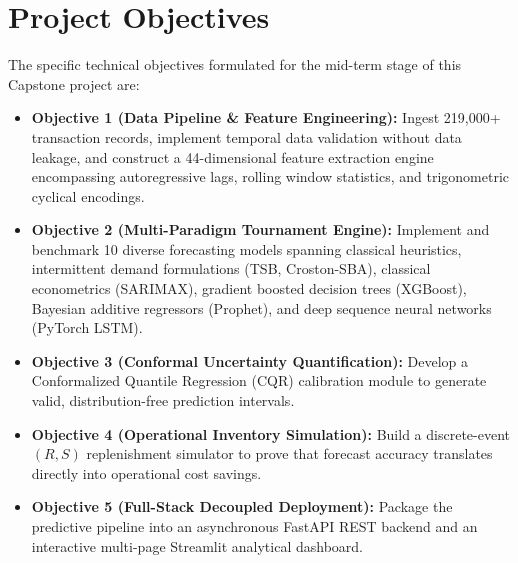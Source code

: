 \documentclass[12pt,a4paper,oneside]{report}
\theoremstyle{definition}
\begin{document}
\section{Project Objectives}
The specific technical objectives formulated for the mid-term stage of this Capstone project are:
\begin{itemize}[itemsep=0.2cm]
    \item \textbf{Objective 1 (Data Pipeline \& Feature Engineering):} Ingest 219,000+ transaction records, implement temporal data validation without data leakage, and construct a 44-dimensional feature extraction engine encompassing autoregressive lags, rolling window statistics, and trigonometric cyclical encodings.
    \item \textbf{Objective 2 (Multi-Paradigm Tournament Engine):} Implement and benchmark 10 diverse forecasting models spanning classical heuristics, intermittent demand formulations (TSB, Croston-SBA), classical econometrics (SARIMAX), gradient boosted decision trees (XGBoost), Bayesian additive regressors (Prophet), and deep sequence neural networks (PyTorch LSTM).
    \item \textbf{Objective 3 (Conformal Uncertainty Quantification):} Develop a Conformalized Quantile Regression (CQR) calibration module to generate valid, distribution-free prediction intervals.
    \item \textbf{Objective 4 (Operational Inventory Simulation):} Build a discrete-event $(R, S)$ replenishment simulator to prove that forecast accuracy translates directly into operational cost savings.
    \item \textbf{Objective 5 (Full-Stack Decoupled Deployment):} Package the predictive pipeline into an asynchronous FastAPI REST backend and an interactive multi-page Streamlit analytical dashboard.
\end{itemize}
\end{document}
